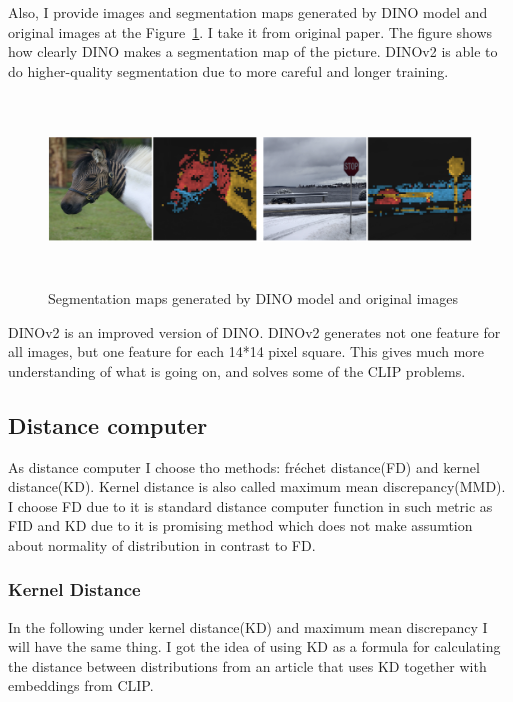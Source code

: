 Also, I provide images and segmentation maps generated by DINO model and original images at the Figure~\ref{fig:DINO_seg_map}. I take it from original paper\cite{DINO}.
The figure shows how clearly DINO makes a segmentation map of the picture. DINOv2 is able to do higher-quality segmentation due to more careful and longer training.
\begin{figure}[hbt]
\centering
\includegraphics[width=15cm, height=5cm]{figs/DINO_seg_map.png}
\caption{Segmentation maps generated by DINO model and original images\cite{DINO}}
\label{fig:DINO_seg_map}
\end{figure}

DINOv2 is an improved version of DINO. DINOv2 generates not one feature for all images, but one feature for each 14*14 pixel square. This gives much more understanding of what is going on, and solves some of the CLIP problems.

\subsection{Distance computer}
As distance computer I choose tho methods: fréchet distance(FD) and kernel distance(KD). Kernel distance is also called maximum mean discrepancy(MMD). I choose FD due to it is standard distance computer function in such metric as FID and KD due to it is promising method which does not make assumtion about normality of distribution in contrast to FD.
\subsubsection{Kernel Distance}
In the following under kernel distance(KD) and maximum mean discrepancy I will have the same thing. I got the idea of using KD as a formula for calculating the distance between distributions from an article that uses KD together with embeddings from CLIP\cite{KD_CLIP}.

